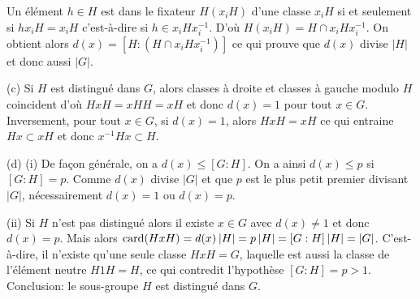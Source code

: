 {{\hskip 5mm Un \'el\'ement $h\in H$ est dans le fixateur $H(x_iH)$ d'une classe
$x_iH$ si et seulement si $hx_iH=x_iH$ c'est-\`a-dire si $h\in x_iHx_i^{-1}$. D'o\`u
$H(x_iH)= H\cap x_iHx_i^{-1}$. On obtient alors $d(x)= [H:(H\cap x_iHx_i^{-1})]$ ce
qui prouve que $d(x)$ divise $|H|$ et donc aussi $|G|$.
\smallskip

(c) Si $H$ est distingu\'e dans $G$, alors classes \`a droite et classes \`a
gauche modulo $H$ coincident d'o\`u $HxH=xHH=xH$ et donc $d(x)=1$ pour tout $x\in
G$. Inversement, pour tout $x\in G$, si $d(x)=1$, alors $HxH=xH$ ce qui entraine
$Hx\subset xH$ et donc $x^{-1}Hx \subset H$.
\smallskip

(d) (i) De fa\c con g\'en\'erale, on a $d(x) \leq [G:H]$. On a ainsi $d(x) \leq p$
si $[G:H]=p$. Comme $d(x)$ divise $|G|$ et que $p$ est le plus petit premier
divisant $|G|$, n\'ecessairement $d(x)=1$ ou $d(x)=p$.
\smallskip

(ii) Si $H$ n'est pas distingu\'e alors il existe $x\in G$ avec $d(x)\not=1$ et
donc $d(x)=p$. Mais alors $\hbox{\rm card}(HxH) = d(x)\hskip 2pt |H| = p\hskip 2pt
|H| = [G:H]\hskip 2pt |H| = |G|$. C'est-\`a-dire, il n'existe qu'une seule classe
$HxH=G$, laquelle est aussi la classe de l'\'el\'ement neutre $H1H=H$, ce qui
contredit l'hypoth\`ese $[G:H]=p>1$. Conclusion: le sous-groupe $H$ est distingu\'e
dans $G$.}
}